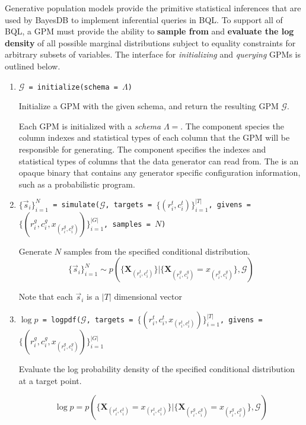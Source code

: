 \documentclass[10pt,letterpaper]{article}
\newcommand{\set}[1]{\{#1\}}
\begin{document}
Generative population models provide the primitive statistical inferences that
are used by BayesDB to implement inferential queries in BQL. To support all of
BQL, a GPM must provide the ability to \textbf{sample from} and \textbf{evaluate
the log density} of all possible marginal distributions subject to equality
constraints for arbitrary subsets of variables. The interface for
\textit{initializing} and \textit{querying} GPMs is outlined below.

\begin{enumerate}

\item \texttt{$\mathcal{G}$ = initialize(schema = $\Lambda$)}

    Initialize a GPM with the given schema, and return the resulting GPM
    $\mathcal{G}$.

    Each GPM is initialized with a \textit{schema} $\Lambda=$. The  component species
    the column indexes and statistical types of each column that the GPM will be
    responsible for generating. The  component specifies the
    indexes and statistical types of columns that the data generator can read
    from. The  is an opaque binary that contains any generator
    specific configuration information, such as a probabilistic program.

\item \texttt{$\set{\vec{s}_i}_{i=1}^N$ =
    simulate($\mathcal{G}$, targets = $\set{(r_i^t,c_i^t)}_{i=1}^{|T|}$, givens
    = $\set{(r_i^g, c_i^g, x_{(r_i^g, c_i^g)})}_{i=1}^{|G|}$, samples = $N$)}

    Generate $N$ samples from the specified conditional distribution.
    $$
    \set{\vec{s}_i}_{i=1}^N \sim p( \set{ \mathbf{X}_{(r_i^t,c_i^t)} } |
    \set{ \mathbf{X}_{(r_i^g,c_i^g)} = x_{(r_i^g,c_i^g)} }, \mathcal{G})
    $$

    Note that each $\vec{s}_i$ is a $|T|$ dimensional vector

\item \texttt{$\log p$ =
    logpdf($\mathcal{G}$, targets = $\set{(r_i^t, c_i^t, x_{(r_i^t,
    c_i^t)})}_{i=1}^{|T|}$, givens = $\set{(r_i^g, c_i^g, x_{(r_i^g,
    c_i^g)})}_{i=1}^{|G|}$}

    Evaluate the log probability density of the specified conditional
    distribution at a target point.

    $$
    \log p = p( \set{ \mathbf{X}_{(r_i^t,c_i^t)} = x_{(r_i^t,c_i^t)} } |
    \set{ \mathbf{X}_{(r_i^g,c_i^g)} = x_{(r_i^g,c_i^g)} }, \mathcal{G})
    $$

\end{enumerate}
\end{document}
